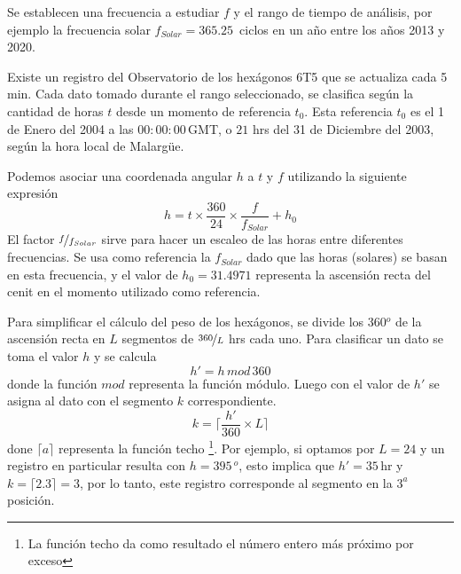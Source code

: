         Se establecen una frecuencia a estudiar $f$ y el rango de tiempo de análisis, por ejemplo la frecuencia solar $f_{Solar}= 365.25\,$ ciclos en un año entre los años 2013 y 2020.

        Existe un registro del Observatorio de los hexágonos 6T5 que se actualiza cada 5 min. Cada dato tomado durante el rango seleccionado, se clasifica según la cantidad de horas $t$ desde un momento de referencia $t_0$. Esta referencia $t_0$ es el 1 de Enero del 2004 a las $00:00:00\,$GMT, o  $21$ hrs del 31 de Diciembre del 2003, según la hora local de Malargüe.

        Podemos asociar una coordenada angular $h$   a $t$  y $f$  utilizando la siguiente expresión
         \begin{equation}
          h = t \times \frac{360}{24} \times\frac{f}{f_{Solar}} + h_0
          \label{eq:h_horas} 
        \end{equation}
        El factor $\nicefrac{f}{f_{Solar}}$ sirve para hacer un escaleo de las horas entre diferentes frecuencias. Se usa como referencia la $f_{Solar}$ dado que las horas (solares) se basan en esta frecuencia, y el valor de $h_0=31.4971$ representa la ascensión recta del cenit en el momento utilizado como referencia.
        
        Para simplificar el cálculo del peso de los hexágonos, se divide los 360$^o$ de la ascensión recta en $L$ segmentos de $\nicefrac{360}{L}$ hrs cada uno. Para clasificar un dato se  toma  el valor $h$  y se calcula
        \begin{equation}
          h' = h\, mod \,360 
          \label{eq:h_primado}
        \end{equation}
        donde la función $mod$ representa la función módulo. Luego con el valor de $h'$ se asigna al dato con el segmento $k$ correspondiente.
        \begin{equation}
          k = \bigg \lceil \frac{h'}{360}\times L \bigg \rceil
        \end{equation}
        done $\lceil a \rceil$ representa la función techo \footnote{La función techo da como resultado el número entero más próximo por exceso}. Por ejemplo, si optamos por $L=24$ y un registro en particular resulta con  $h=395\,^o$, esto implica que $h'= 35\,$hr y $k=\lceil 2.3 \rceil=3$, por lo tanto, este registro corresponde al segmento en la $3^{a}$ posición.

